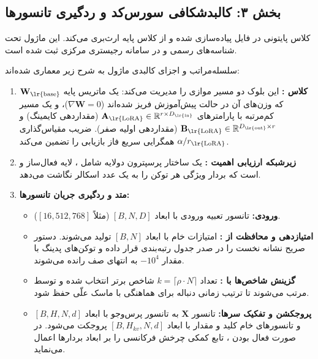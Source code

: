 \subsection*{بخش ۳: کالبدشکافی سورس‌کد و ردگیری تانسورها }
کلاس پایتونی  در فایل  پیاده‌سازی شده و از کلاس پایه  ارث‌بری می‌کند. این ماژول تحت شناسه‌های رسمی  و  در سامانه رجیستری مرکزی ثبت شده است.

سلسله‌مراتب و اجزای کالبدی ماژول به شرح زیر معماری شده‌اند:
\begin{enumerate}
    \item \textbf{کلاس :} این بلوک دو مسیر موازی را مدیریت می‌کند: یک ماتریس پایه $\mathbf{W}_{\text{\lr{base}}}$ که وزن‌های آن در حالت پیش‌آموزش فریز شده‌اند ($\nabla \mathbf{W} = 0$)، و یک مسیر کم‌مرتبه با پارامترهای $\mathbf{A}_{\text{\lr{LoRA}}} \in \mathbb{R}^{r \times D_{\text{\lr{in}}}}$ (مقداردهی کایمینگ) و $\mathbf{B}_{\text{\lr{LoRA}}} \in \mathbb{R}^{D_{\text{\lr{out}}} \times r}$ (مقداردهی اولیه صفر). ضریب مقیاس‌گذاری $\alpha / r_{\text{\lr{LoRA}}}$ همگرایی سریع فاز بازیابی را تضمین می‌کند.
    \item \textbf{زیرشبکه ارزیابی اهمیت :} یک ساختار پرسپترون دولایه شامل ، لایه فعال‌ساز  و  است که بردار ویژگی هر توکن را به یک عدد اسکالر نگاشت می‌دهد.
    \item \textbf{متد  و ردگیری جریان تانسورها:}
    \begin{itemize}
        \item \textbf{ورودی:} تانسور تعبیه ورودی با ابعاد $[B, N, D]$ (مثلاً $[16, 512, 768]$).
        \item \textbf{امتیازدهی و محافظت از \lr{[CLS]}:} امتیازات خام با ابعاد $[B, N]$ تولید می‌شوند. دستور صریح  نشانه نخست را در صدر جدول رتبه‌بندی قرار داده و توکن‌های پدینگ با مقدار $-10^4$ به انتهای صف رانده می‌شوند.
        \item \textbf{گزینش شاخص‌ها با :} تعداد $k = \lceil \rho \cdot N \rceil$ شاخص برتر انتخاب شده و توسط  مرتب می‌شوند تا ترتیب زمانی دنباله برای هماهنگی با ماسک علّی حفظ شود.
        \item \textbf{پروجکشن و تفکیک سرها:} تانسور $\mathbf{X}$ به تانسور پرس‌وجو با ابعاد $[B, H, N, d]$ و تانسورهای خام کلید و مقدار با ابعاد $[B, H_{kv}, N, d]$ پروجکت می‌شود. در صورت فعال بودن ، تابع کمکی  چرخش فرکانسی را بر ابعاد بردارها اعمال می‌نماید.

\end{itemize}
\end{enumerate}
